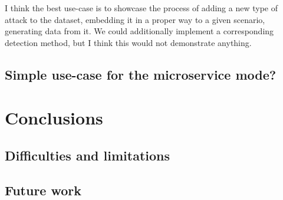 \documentclass[sigconf]{acmart}
\begin{document}
I think the best use-case is to showcase the process of adding a new type of attack to the dataset, embedding it in a proper way to a given scenario, generating data from it. We could additionally implement a corresponding detection method, but I think this would not demonstrate anything. 


\subsection{Simple use-case for the microservice mode?}

\section{Conclusions}\label{Sec:Conclusion}



\subsection{Difficulties and limitations}


\subsection{Future work}









 




\end{document}
